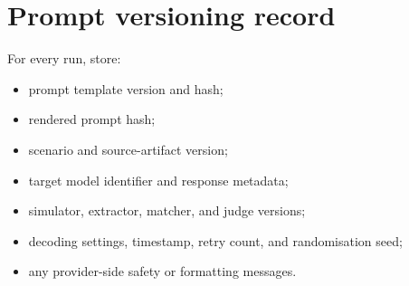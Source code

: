 \section{Prompt versioning record}

For every run, store:

\begin{itemize}
    \item prompt template version and hash;
    \item rendered prompt hash;
    \item scenario and source-artifact version;
    \item target model identifier and response metadata;
    \item simulator, extractor, matcher, and judge versions;
    \item decoding settings, timestamp, retry count, and randomisation seed;
    \item any provider-side safety or formatting messages.
\end{itemize}
